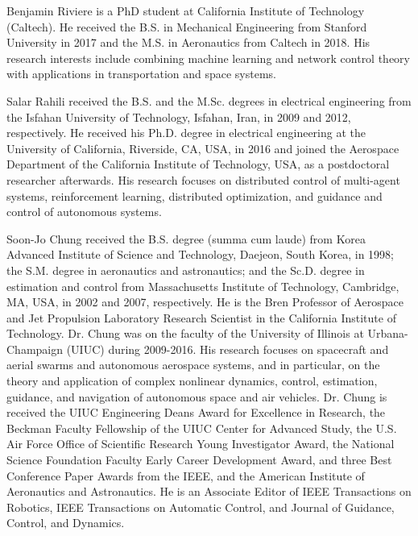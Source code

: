 \documentclass[journal]{IEEEtran}
\begin{document}




\begin{IEEEbiographynophoto}{Benjamin Riviere}
is a PhD student at California Institute of Technology (Caltech). He received the B.S. in Mechanical Engineering from Stanford University in 2017 and the M.S. in Aeronautics from Caltech in 2018. His research interests include combining machine learning and network control theory with applications in transportation and space systems. 
\end{IEEEbiographynophoto}

\begin{IEEEbiographynophoto}{Salar Rahili} received the B.S. and the M.Sc. degrees in electrical engineering from the Isfahan University of Technology, Isfahan, Iran, in 2009 and 2012, respectively. He received his Ph.D. degree in electrical engineering at the University of California, Riverside, CA, USA, in 2016 and joined the Aerospace Department of the California Institute of Technology, USA, as a postdoctoral researcher afterwards.  His research focuses on distributed control of multi-agent systems, reinforcement learning, distributed optimization, and guidance and control of autonomous systems. 
\end{IEEEbiographynophoto}

\begin{IEEEbiographynophoto}{Soon-Jo Chung} received the B.S. degree (summa cum laude) from Korea Advanced Institute of Science and Technology, Daejeon, South Korea, in 1998; the S.M. degree in aeronautics and astronautics; and the Sc.D. degree in estimation and control from Massachusetts Institute of Technology, Cambridge, MA, USA, in 2002 and 2007, respectively. He is the Bren Professor of Aerospace and Jet Propulsion Laboratory Research Scientist in the California Institute of Technology. Dr. Chung was on the faculty of the University of Illinois at Urbana-Champaign (UIUC) during 2009-2016. His research focuses on spacecraft and aerial swarms and autonomous aerospace systems, and in particular, on the theory and application of complex nonlinear dynamics, control, estimation, guidance, and navigation of autonomous space and air vehicles. Dr. Chung is received the UIUC Engineering Deans Award for Excellence in Research, the Beckman Faculty Fellowship of the UIUC Center for Advanced Study, the U.S. Air Force Office of Scientific Research Young Investigator Award, the National Science Foundation Faculty Early
Career Development Award, and three Best Conference Paper Awards from the IEEE, and the American Institute of Aeronautics and Astronautics. He is an Associate Editor of IEEE Transactions on Robotics, IEEE Transactions on Automatic Control, and Journal of Guidance, Control, and Dynamics.
\end{IEEEbiographynophoto}
\end{document}
